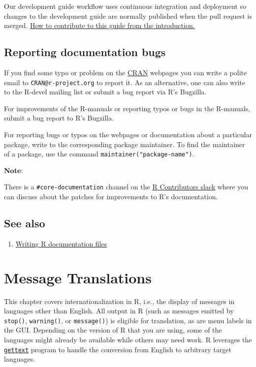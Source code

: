 \documentclass[
]{book}
\providecommand{\tightlist}{%
  \setlength{\itemsep}{0pt}\setlength{\parskip}{0pt}}
\begin{document}
Our development guide workflow uses continuous integration and deployment so changes to the development guide are normally published when the pull request is merged. \hyperref[how-to-contribute-to-this-guide]{How to contribute to this guide from the introduction.}

\section{Reporting documentation bugs}\label{reporting-documentation-bugs}

If you find some typo or problem on the \href{https://cran.r-project.org}{CRAN} webpages you can write a polite email to \texttt{CRAN@r-project.org} to report it. As an alternative, one can also write to the R-devel mailing list or submit a bug report via R's Bugzilla.

For improvements of the R-manuals or reporting typos or bugs in the R-manuals, submit a bug report to R's Bugzilla.

For reporting bugs or typos on the webpages or documentation about a particular package, write to the corresponding package maintainer. To find the maintainer of a package, use the command \texttt{maintainer("package-name")}.

\textbf{Note}:

There is a \texttt{\#core-documentation} channel on the \href{https://r-contributors.slack.com/}{R Contributors slack} where you can discuss about the patches for improvements to R's documentation.

\section{See also}\label{see-also-5}

\begin{enumerate}
\def\labelenumi{\arabic{enumi}.}
\tightlist
\item
  \href{https://cran.r-project.org/doc/manuals/r-release/R-exts.html\#Writing-R-documentation-files}{Writing R documentation files}
\end{enumerate}

\chapter{Message Translations}\label{message-translations}

This chapter covers internationalization in R, i.e., the display of
messages in languages other than English. All output in R (such as
messages emitted by \texttt{stop()}, \texttt{warning()}, or \texttt{message()}) is eligible
for translation, as are menu labels in the GUI. Depending on the version
of R that you are using, some of the languages might already be
available while others may need work. R leverages the
\href{https://www.gnu.org/software/gettext/}{\texttt{gettext}} program to handle the
conversion from English to arbitrary target languages.
\end{document}
